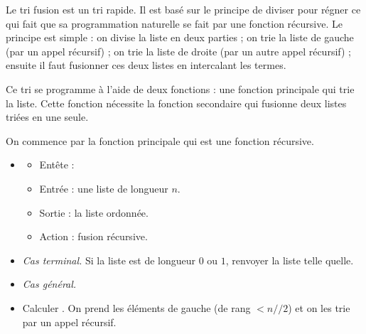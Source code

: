 \documentclass[11pt,class=report,crop=false]{standalone}
\begin{document}

\begin{activite}
	
	
	
	Le tri fusion est un tri rapide. Il est basé sur le principe de \og{}diviser pour régner\fg{} ce qui fait que sa programmation naturelle se fait
	par une fonction récursive. Le principe est simple : on divise la liste en deux parties ; on trie la liste de gauche (par un appel récursif) ; on trie la liste de droite (par un autre appel récursif) ; ensuite il faut fusionner ces deux listes en intercalant les termes.
	
	
	Ce tri se programme à l'aide de deux fonctions : une fonction principale  qui trie la liste. Cette fonction nécessite la fonction secondaire  qui fusionne deux listes triées en une seule. 
	
	\bigskip 
	
	On commence par la fonction principale qui est une fonction récursive.
	\begin{algorithme}
	\sauteligne 
	
	\begin{itemize}
		\item 
		\begin{itemize}
			\item Entête :  
			\item Entrée : une liste de longueur $n$.			
			\item Sortie : la liste ordonnée.		
			\item Action : fusion récursive.		
		\end{itemize}
		
		\item \emph{Cas terminal.} Si la liste est de longueur $0$ ou $1$, renvoyer la liste telle quelle.
		
		\item \emph{Cas général.} 
		
		\item Calculer . On prend les éléments de gauche (de rang $< n//2$) et on les trie par un appel récursif.
		

\end{itemize}
\end{algorithme}
\end{activite}
\end{document}
